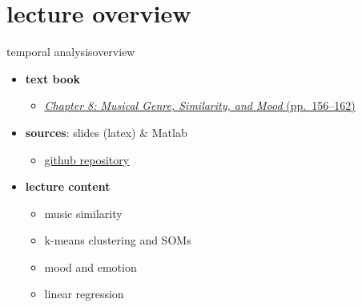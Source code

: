 

\subtitle{Part 9.2: Music Similarity and Mood Recognition}


	

    \section[overview]{lecture overview}
        \begin{frame}{temporal analysis}{overview}
            \begin{itemize}
                \item   \textbf{text book}  
                    \begin{itemize}
                        \item   \href{http://ieeexplore.ieee.org/xpl/articleDetails.jsp?tp=&arnumber=6331125&}{\underline{\textit{Chapter 8: Musical Genre, Similarity, and Mood} (pp.~156--162)}}
                    \end{itemize}
                \item   \textbf{sources}: slides (latex) \& Matlab  
                    \begin{itemize}
                        \item   \href{https://github.com/alexanderlerch/ACA-Slides}{\underline{github repository}}
                    \end{itemize}
                \bigskip
                \item<2->   \textbf{lecture content}
                    \begin{itemize}
                        \item<2->  music similarity 
                        \item<3->  k-means clustering and SOMs 
                        \item<4->  mood and emotion
                        \item<5->  linear regression
                    \end{itemize}
            \end{itemize}
        \end{frame}

